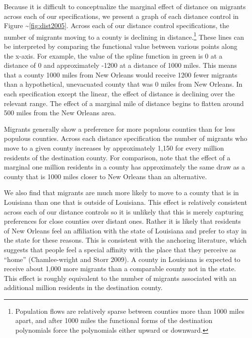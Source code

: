 \documentclass[]{article}
\let\rmarkdownfootnote\footnote%
\def\footnote{\protect\rmarkdownfootnote}
\begin{document}
Because it is difficult to conceptualize the marginal effect of distance
on migrants across each of our specifications, we present a graph of
each distance control in Figure \textasciitilde{}\ref{fig:dist2005}.
Across each of our distance control specifications, the number of
migrants moving to a county is declining in distance.\footnote{Population
  flows are relatively sparse between counties more than 1000 miles
  apart, and after 1000 miles the functional forms of the destination
  polynomials force the polynomials either upward or downward.} These
lines can be interpreted by comparing the functional value between
various points along the x-axis. For example, the value of the spline
function in green is 0 at a distance of 0 and approximately -1200 at a
distance of 1000 miles. This means that a county 1000 miles from New
Orleans would receive 1200 fewer migrants than a hypothetical,
unevacuated county that was 0 miles from New Orleans. In each
specification except the linear, the effect of distance is declining
over the relevant range. The effect of a marginal mile of distance
begins to flatten around 500 miles from the New Orleans area.

Migrants generally show a preference for more populous counties than for
less populous counties. Across each distance specification the number of
migrants who move to a given county increases by approximately 1,150 for
every million residents of the destination county. For comparison, note
that the effect of a marginal one million residents in a county has
approximately the same draw as a county that is 1000 miles closer to New
Orleans than an alternative.

We also find that migrants are much more likely to move to a county that
is in Louisiana than one that is outside of Louisiana. This effect is
relatively consistent across each of our distance controls so it is
unlikely that this is merely capturing preferences for close counties
over distant ones. Rather it is likely that residents of New Orleans
feel an affiliation with the state of Louisiana and prefer to stay in
the state for these reasons. This is consistent with the anchoring
literature, which suggests that people feel a special affinity with the
place that they perceive as ``home'' (Chamlee-wright and Storr 2009). A
county in Louisiana is expected to receive about 1,000 more migrants
than a comparable county not in the state. This effect is roughly
equivalent to the number of migrants associated with an additional
million residents in the destination county.
\end{document}
